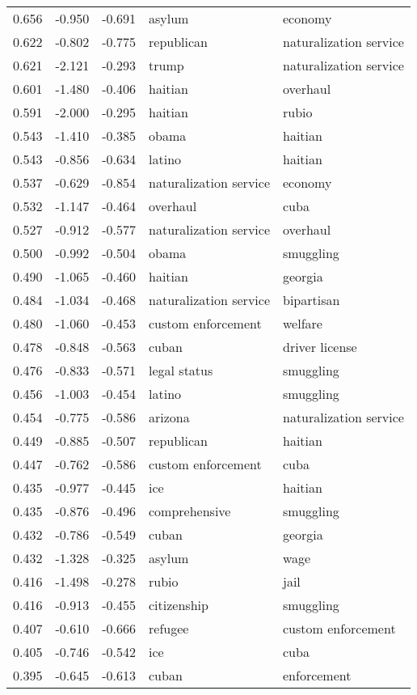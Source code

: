 \begin{tabular}{cccp{5cm}p{5cm}}
0.656 & -0.950 & -0.691 & asylum & economy \\
0.622 & -0.802 & -0.775 & republican & naturalization service \\
0.621 & -2.121 & -0.293 & trump & naturalization service \\
0.601 & -1.480 & -0.406 & haitian & overhaul \\
0.591 & -2.000 & -0.295 & haitian & rubio \\
0.543 & -1.410 & -0.385 & obama & haitian \\
0.543 & -0.856 & -0.634 & latino & haitian \\
0.537 & -0.629 & -0.854 & naturalization service & economy \\
0.532 & -1.147 & -0.464 & overhaul & cuba \\
0.527 & -0.912 & -0.577 & naturalization service & overhaul \\
0.500 & -0.992 & -0.504 & obama & smuggling \\
0.490 & -1.065 & -0.460 & haitian & georgia \\
0.484 & -1.034 & -0.468 & naturalization service & bipartisan \\
0.480 & -1.060 & -0.453 & custom enforcement & welfare \\
0.478 & -0.848 & -0.563 & cuban & driver license \\
0.476 & -0.833 & -0.571 & legal status & smuggling \\
0.456 & -1.003 & -0.454 & latino & smuggling \\
0.454 & -0.775 & -0.586 & arizona & naturalization service \\
0.449 & -0.885 & -0.507 & republican & haitian \\
0.447 & -0.762 & -0.586 & custom enforcement & cuba \\
0.435 & -0.977 & -0.445 & ice & haitian \\
0.435 & -0.876 & -0.496 & comprehensive & smuggling \\
0.432 & -0.786 & -0.549 & cuban & georgia \\
0.432 & -1.328 & -0.325 & asylum & wage \\
0.416 & -1.498 & -0.278 & rubio & jail \\
0.416 & -0.913 & -0.455 & citizenship & smuggling \\
0.407 & -0.610 & -0.666 & refugee & custom enforcement \\
0.405 & -0.746 & -0.542 & ice & cuba \\
0.395 & -0.645 & -0.613 & cuban & enforcement \\

\end{tabular}
